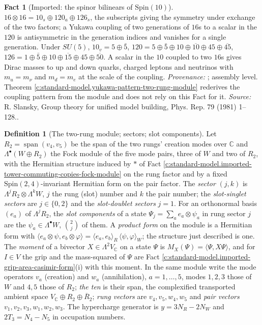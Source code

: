\documentclass[11pt]{article}
\theoremstyle{definition}
\newtheorem{definition}[theorem]{Definition}
\newtheorem{fact}[theorem]{Fact}
\theoremstyle{plain}
\providecommand{\C}{}\renewcommand{\C}{\mathbb{C}}
\providecommand{\ip}{}\renewcommand{\ip}[2]{\langle #1, #2\rangle}
\begin{document}
\begin{fact}[Imported: the spinor bilinears of $\mathrm{Spin}(10)$]\label{c:standard-model.imported-spinor-bilinears}
$16 \otimes 16 = 10_{s} \oplus 120_{a} \oplus 126_{s}$, the subscripts giving the symmetry under exchange of the two factors; a Yukawa coupling of two generations of $16$s to a scalar in the $120$ is antisymmetric in the generation indices and vanishes for a single generation. Under $SU(5)$, $10_{v} = 5 \oplus \bar{5}$, $120 = 5 \oplus \bar{5} \oplus 10 \oplus \overline{10} \oplus 45 \oplus \overline{45}$, $126 = 1 \oplus \bar{5} \oplus 10 \oplus \overline{15} \oplus 45 \oplus \overline{50}$. A scalar in the $10$ coupled to two $16$s gives Dirac masses to up and down quarks, charged leptons and neutrinos with $m_{u} = m_{\nu}$ and $m_{d} = m_{e}$ at the scale of the coupling. \emph{Provenance:} \cite{Slansky1981}; assembly level. Theorem \ref{c:standard-model.yukawa-pattern-two-rung-module} rederives the coupling pattern from the module and does not rely on this Fact for it.
\emph{Source:} R. Slansky, Group theory for unified model building, Phys. Rep. 79 (1981) 1--128..
\end{fact}

\begin{definition}[The two-rung module; sectors; slot components]\label{c:obj.standard-model.two-rung-module-sectors-slot-components}
Let $R_{2} = \operatorname{span}(v_{4}, v_{5})$ be the span of the two rungs' creation modes over $\C$ and $\Lambda^{\bullet}(W \oplus R_{2})$ the Fock module of the five mode pairs, three of $W$ and two of $R_{2}$, with the Hermitian structure induced by $*$ of Fact \ref{c:standard-model.imported-tower-commuting-copies-fock-module} on the rung factor and by a fixed $\mathrm{Spin}(2,4)$-invariant Hermitian form on the pair factor. The \emph{sector} $(j, k)$ is $\Lambda^{j}R_{2} \otimes \Lambda^{k}W$, $j$ the rung (slot) number and $k$ the pair number; the \emph{slot-singlet sectors} are $j \in \{0, 2\}$ and the \emph{slot-doublet sectors} $j = 1$. For an orthonormal basis $(e_{a})$ of $\Lambda^{j}R_{2}$, the \emph{slot components} of a state $\Psi_{j} = \sum_{a} e_{a} \otimes \psi_{a}$ in rung sector $j$ are the $\psi_{a} \in \Lambda^{\bullet}W$, $\binom{2}{j}$ of them. A \emph{product form} on the module is a Hermitian form with $\ip{e_{a} \otimes \psi}{e_{b} \otimes \varphi} = \ip{e_{a}}{e_{b}}_{R}\,\ip{\psi}{\varphi}_{W}$; the structure just described is one. The \emph{moment} of a bivector $X \in \Lambda^{2}V_{\C}$ on a state $\Psi$ is $M_{X}(\Psi) = \ip{\Psi}{X\Psi}$, and for $I \in V$ the grip and the mass-squared of $\Psi$ are Fact \ref{c:standard-model.imported-grip-area-casimir-form}(i) with this moment.
In the same module write the mode operators $v_{a}$ (creation) and $w_{a}$ (annihilation), $a = 1, \ldots, 5$, modes $1, 2, 3$ those of $W$ and $4, 5$ those of $R_{2}$; \emph{the ten} is their span, the complexified transported ambient space $V_{\C} \oplus R_{2} \oplus \overline{R}_{2}$; \emph{rung vectors} are $v_{4}, v_{5}, w_{4}, w_{5}$ and \emph{pair vectors} $v_{1}, v_{2}, v_{3}, w_{1}, w_{2}, w_{3}$. The hypercharge generator is $y = 3N_{R} - 2N_{W}$ and $2T_{3} = N_{4} - N_{5}$ in occupation numbers.
\end{definition}
\end{document}
